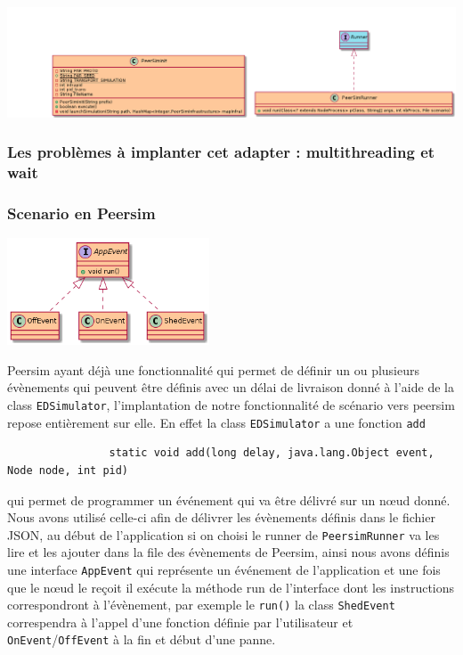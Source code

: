 \documentclass{article}
\begin{document}
					\hspace*{-3.2cm} \includegraphics[width=20cm]{uml/peersim2.png}

				\subsubsection{Les problèmes à implanter cet adapter : multithreading et wait}
				
				\subsubsection{Scenario en Peersim}
				\vspace{5mm}
				\hspace*{5cm} \includegraphics[width=60mm]{uml/scenPuml.png}
				
				\vspace{5mm}
				Peersim ayant déjà une fonctionnalité qui permet de définir un ou plusieurs évènements qui peuvent être définis avec un délai de livraison donné à l'aide de la class \verb|EDSimulator|,
				l'implantation de notre fonctionnalité de scénario vers peersim repose entièrement sur elle.
				En effet la class \verb|EDSimulator| a une fonction \verb|add|
				\begin{lstlisting}
				static void add(long delay, java.lang.Object event, Node node, int pid)
				\end{lstlisting}
				qui permet de programmer un événement qui va être délivré sur un nœud donné. 
				\newline
				Nous avons utilisé celle-ci afin de délivrer les évènements définis dans le fichier JSON, au début de l'application si on choisi le runner de \verb|PeersimRunner| va 
				les lire et les ajouter dans la file des évènements de Peersim, ainsi nous avons définis une interface \verb|AppEvent| qui représente un événement de l'application et une fois 
				que le nœud le reçoit il exécute la méthode run de l'interface dont les instructions correspondront à l'évènement, par exemple le \verb|run()| la class \verb|ShedEvent| 
				correspendra à l'appel d'une fonction définie par l'utilisateur et  \verb|OnEvent|/\verb|OffEvent| à la fin et début d'une panne.
		
\end{document}
